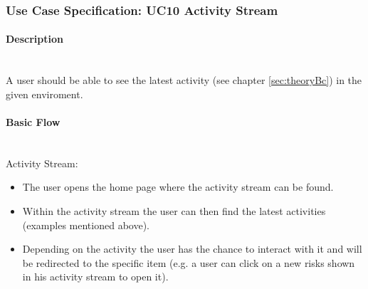 
\newpage
\subsubsection{Use Case Specification: \ac{UC}10 Activity Stream}
\label{sec:domainBbk}

\paragraph*{Description}\mbox{}\\
A user should be able to see the latest activity (see chapter \ref{sec:theoryBc}) in the given enviroment.


\paragraph*{Basic Flow} \mbox{}\\
\noindent
Activity Stream: 
\begin{itemize}
	\vspace{-3mm}
	\setlength\itemsep{-1em}
	\item The user opens the home page where the activity stream can be found.
	\item Within the activity stream the user can then find the latest activities (examples mentioned above).
	\item Depending on the activity the user has the chance to interact with it and will be redirected to the specific item (e.g. a user can click on a new risks shown in his activity stream to open it).
\end{itemize} 

